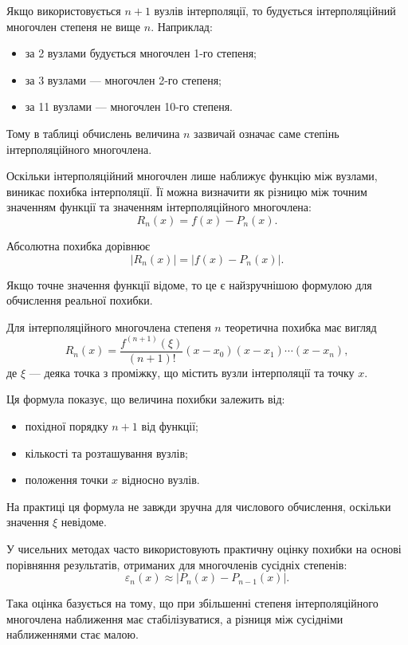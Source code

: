\documentclass[12pt,a4paper]{article}
\begin{document}
    Якщо використовується $n+1$ вузлів інтерполяції, то будується інтерполяційний многочлен степеня не вище $n$. Наприклад:
    \begin{itemize}
        \item за 2 вузлами будується многочлен 1-го степеня;
        \item за 3 вузлами --- многочлен 2-го степеня;
        \item за 11 вузлами --- многочлен 10-го степеня.
    \end{itemize}

    Тому в таблиці обчислень величина $n$ зазвичай означає саме степінь інтерполяційного многочлена.

    Оскільки інтерполяційний многочлен лише наближує функцію між вузлами, виникає похибка інтерполяції. Її можна визначити як різницю між точним значенням функції та значенням інтерполяційного многочлена:
    $$
    R_n(x)=f(x)-P_n(x).
    $$

    Абсолютна похибка дорівнює
    $$
    |R_n(x)| = |f(x)-P_n(x)|.
    $$

    Якщо точне значення функції відоме, то це є найзручнішою формулою для обчислення реальної похибки.

    Для інтерполяційного многочлена степеня $n$ теоретична похибка має вигляд
    $$
    R_n(x)=
    \frac{f^{(n+1)}(\xi)}{(n+1)!}
    (x-x_0)(x-x_1)\cdots(x-x_n),
    $$
    де $\xi$ --- деяка точка з проміжку, що містить вузли інтерполяції та точку $x$.

    Ця формула показує, що величина похибки залежить від:
    \begin{itemize}
        \item похідної порядку $n+1$ від функції;
        \item кількості та розташування вузлів;
        \item положення точки $x$ відносно вузлів.
    \end{itemize}

    На практиці ця формула не завжди зручна для числового обчислення, оскільки значення $\xi$ невідоме.

    У чисельних методах часто використовують практичну оцінку похибки на основі порівняння результатів, отриманих для многочленів сусідніх степенів:
    $$
    \varepsilon_n(x)\approx |P_n(x)-P_{n-1}(x)|.
    $$

    Така оцінка базується на тому, що при збільшенні степеня інтерполяційного многочлена наближення має стабілізуватися, а різниця між сусідніми наближеннями стає малою.
\end{document}
